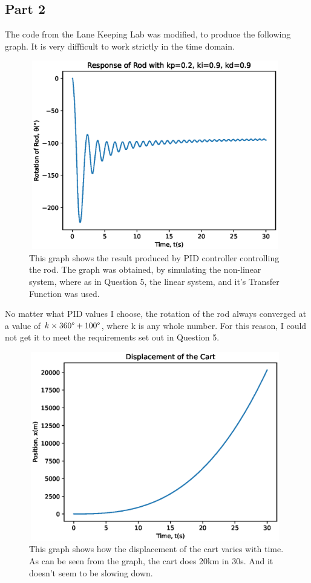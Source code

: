 \documentclass[a4paper,10pt,reqno]{article}
\numberwithin{equation}{section}
\begin{document}
\subsection{Part 2}
The code from the Lane Keeping Lab was modified, to produce the following graph. It is very diffficult to work strictly in the time domain.
\begin{figure}[H]
\centering
\includegraphics[width=11cm, height=8.25cm]{Response_Rod_t.eps}
\caption
{This graph shows the result produced by PID controller controlling the rod. The graph was obtained, by simulating the non-linear system, where as in Question 5, the linear system, and it's Transfer Function was used.}
\end{figure}

\noindent
No matter what PID values I choose, the rotation of the rod always converged at a value of $k \times 360\degree + 100\degree$, where k is any whole number. For this reason, I could not get it to meet the requirements set out in Question 5.\\

\begin{figure}[H]
\centering
\includegraphics[width=11cm, height=8.25cm]{Q6_pos.eps}
\caption
{This graph shows how the displacement of the cart varies with time. As can be seen from the graph, the cart does 20km in 30s. And it doesn't seem to be slowing down.}
\end{figure}
\end{document}
